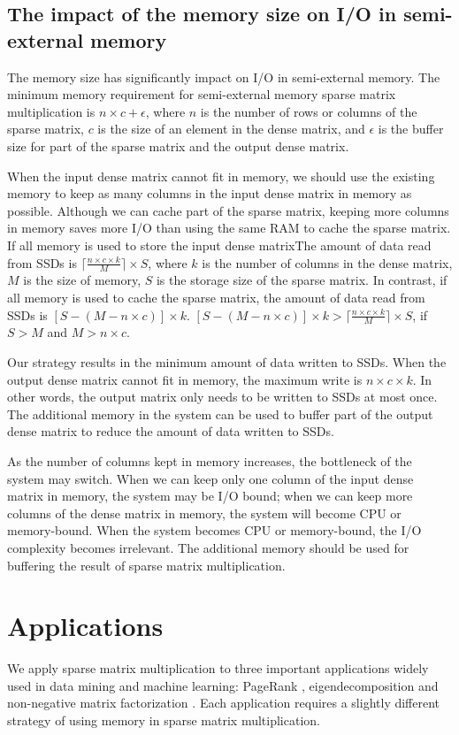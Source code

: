 \subsection{The impact of the memory size on I/O in semi-external memory}
The memory size has significantly impact on I/O in semi-external memory.
The minimum memory requirement for semi-external memory sparse matrix
multiplication is $n \times c + \epsilon$, where $n$ is the number of rows or
columns of the sparse matrix, $c$ is the size of an element in the dense matrix,
and $\epsilon$ is the buffer size for part of the sparse matrix and the output
dense matrix.

When the input dense matrix cannot fit in memory, we should use the existing memory
to keep as many columns in the input dense matrix in memory as possible. Although
we can cache part of the sparse matrix, keeping more columns in memory saves more
I/O than using the same RAM to cache the sparse matrix. If all memory is used to
store the input dense matrixThe amount of data read from SSDs is
$\lceil \frac{n \times c \times k}{M} \rceil \times S$, where $k$ is the number
of columns in the dense matrix, $M$ is the size of memory, $S$ is the storage
size of the sparse matrix. In contrast, if all memory is used to cache the sparse
matrix, the amount of data read from SSDs is $[S - (M - n \times c)] \times k$.
$[S - (M - n \times c)] \times k > \lceil \frac{n \times c \times k}{M} \rceil \times S$,
if $S > M$ and $M > n \times c$.

Our strategy results in the minimum amount of data written to SSDs. When the output
dense matrix cannot fit in memory, the maximum write is $n \times c \times k$.
In other words, the output matrix only needs to be written to SSDs at most once.
The additional memory in the system can be used to buffer part of the output
dense matrix to reduce the amount of data written to SSDs.

As the number of columns kept in memory increases, the bottleneck of the system
may switch. When we can keep only one column of the input dense matrix in memory,
the system may be I/O bound; when we can keep more columns of the dense matrix
in memory, the system will become CPU or memory-bound. When the system becomes
CPU or memory-bound, the I/O complexity becomes irrelevant. The additional memory
should be used for buffering the result of sparse matrix multiplication.

\section{Applications}
We apply sparse matrix multiplication to three important applications widely
used in data mining and machine learning: PageRank \cite{pagerank},
eigendecomposition \cite{anasazi} and non-negative matrix factorization \cite{nmf}.
Each application requires a slightly different strategy of using memory in
sparse matrix multiplication.

